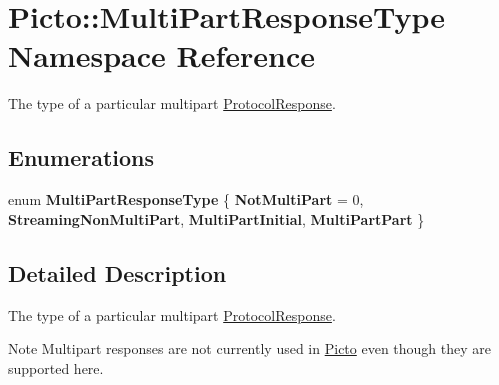 \hypertarget{namespace_picto_1_1_multi_part_response_type}{\section{Picto\-:\-:Multi\-Part\-Response\-Type Namespace Reference}
\label{namespace_picto_1_1_multi_part_response_type}
}


The type of a particular multipart \hyperlink{struct_picto_1_1_protocol_response}{Protocol\-Response}.  


\subsection*{Enumerations}
\begin{DoxyCompactItemize}
\item 
enum {\bfseries Multi\-Part\-Response\-Type} \{ {\bfseries Not\-Multi\-Part} = 0, 
{\bfseries Streaming\-Non\-Multi\-Part}, 
{\bfseries Multi\-Part\-Initial}, 
{\bfseries Multi\-Part\-Part}
 \}
\end{DoxyCompactItemize}


\subsection{Detailed Description}
The type of a particular multipart \hyperlink{struct_picto_1_1_protocol_response}{Protocol\-Response}. \begin{DoxyNote}{Note}
Multipart responses are not currently used in \hyperlink{namespace_picto}{Picto} even though they are supported here. 
\end{DoxyNote}
